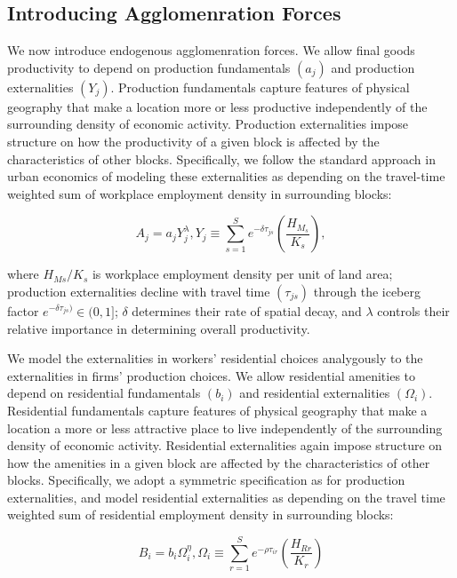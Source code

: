 \subsection{Introducing Agglomenration Forces}

We now introduce endogenous agglomenration forces. We allow final goods productivity to depend on production fundamentals $(a_j)$ and production externalities $(Y_j)$. Production fundamentals capture features of physical geography that make a location more or less productive independently of the surrounding density of economic activity. Production externalities impose structure on how the productivity of a given block is affected by the characteristics of other blocks. Specifically, we follow the standard approach in urban economics of modeling these externalities as depending on the travel-time weighted sum of workplace employment density in surrounding blocks:

\begin{equation}
  A_j = a_j Y_j^{\lambda}, Y_j \equiv \sum_{s=1}^S e^{-\delta \tau_{js}} (\frac{H_{M_s}}{K_s}),
\end{equation}

where $H_{Ms}/K_s$ is workplace employment density per unit of land area; production externalities decline with travel time $(\tau_{js})$ through the iceberg factor $e^{-\delta \tau_{js})} \in (0, 1]$; $\delta$ determines their rate of spatial decay, and $\lambda$ controls their relative importance in determining overall productivity.

We model the externalities in workers' residential choices analygously to the externalities in firms' production choices. We allow residential amenities to depend on residential fundamentals $(b_i)$ and residential externalities $(\Omega_i)$. Residential fundamentals capture features of physical geography that make a location a more or less attractive place to live independently of the surrounding density of economic activity. Residential externalities again impose structure on how the amenities in a given block are affected by the characteristics of other blocks. Specifically, we adopt a symmetric specification as for production externalities, and model residential externalities as depending on the travel time weighted sum of residential employment density in surrounding blocks:

\begin{equation}
  B_i = b_i \Omega_i^{\eta}, \Omega_i \equiv \sum_{r=1}^S e^{-\rho \tau_{ir}} (\frac{H_{Rr}}{K_r})
\end{equation}

